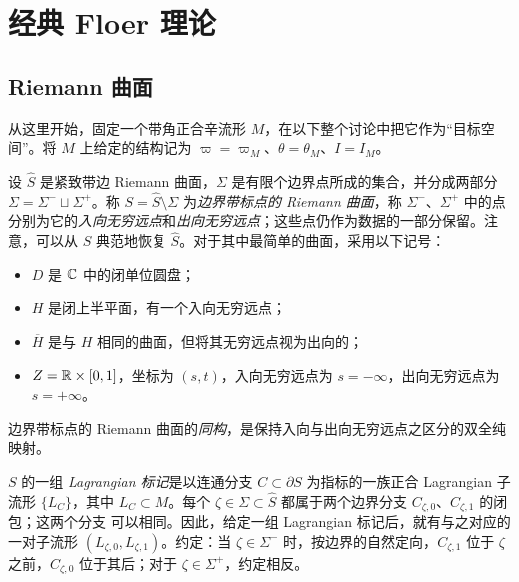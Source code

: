 \section{经典 Floer 理论}\label{sec:8}
\subsection{Riemann 曲面}\label{sec:8a}
从这里开始，固定一个带角正合辛流形 $M$，在以下整个讨论中把它作为“目标空间”。将 $M$ 上给定的结构记为 $\varpi=\varpi_M$、$\theta=\theta_M$、$I=I_M$。
\begin{definition*}
设 $\widehat S$ 是紧致带边 Riemann 曲面，$\Sigma$ 是有限个边界点所成的集合，并分成两部分 $\Sigma=\Sigma^-\sqcup\Sigma^+$。称 $S=\widehat S\setminus\Sigma$ 为\emph{边界带标点的 Riemann 曲面}，称 $\Sigma^-$、$\Sigma^+$ 中的点分别为它的\emph{入向无穷远点}和\emph{出向无穷远点}；这些点仍作为数据的一部分保留。注意，可以从 $S$ 典范地恢复 $\widehat S$。对于其中最简单的曲面，采用以下记号：
\begin{itemize}
\item $D$ 是 $\mathbb C$ 中的闭单位圆盘；
\item $H$ 是闭上半平面，有一个入向无穷远点；
\item $\overline H$ 是与 $H$ 相同的曲面，但将其无穷远点视为出向的；
\item $Z=\mathbb R\times[0,1]$，坐标为 $(s,t)$，入向无穷远点为 $s=-\infty$，出向无穷远点为 $s=+\infty$。
\end{itemize}
边界带标点的 Riemann 曲面的\emph{同构}，是保持入向与出向无穷远点之区分的双全纯映射。
\end{definition*}
\begin{definition*}
$S$ 的一组 \emph{Lagrangian 标记}是以连通分支 $C\subset\partial S$ 为指标的一族正合 Lagrangian 子流形 $\{L_C\}$，其中 $L_C\subset M$。每个 $\zeta\in\Sigma\subset\widehat S$ 都属于两个边界分支 $C_{\zeta,0}$、$C_{\zeta,1}$ 的闭包；这两个分支
可以相同。因此，给定一组 Lagrangian 标记后，就有与之对应的一对子流形 $(L_{\zeta,0},L_{\zeta,1})$。约定：当 $\zeta\in\Sigma^-$ 时，按边界的自然定向，$C_{\zeta,1}$ 位于 $\zeta$ 之前，$C_{\zeta,0}$ 位于其后；对于 $\zeta\in\Sigma^+$，约定相反。
\end{definition*}

